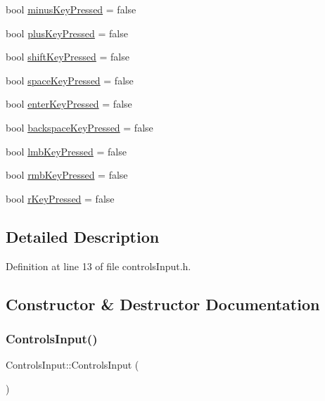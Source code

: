 \begin{DoxyCompactItemize}
\item 
bool \hyperlink{struct_controls_input_a68b463995619f9b9a202dc84301728d0}{minus\+Key\+Pressed} = false
\item 
bool \hyperlink{struct_controls_input_ae4cfd2052a042c57c601ba2c3ed6fec1}{plus\+Key\+Pressed} = false
\item 
bool \hyperlink{struct_controls_input_a94141ee53845274d300476291bf74d7a}{shift\+Key\+Pressed} = false
\item 
bool \hyperlink{struct_controls_input_a36c963eb0406507823f8c69a8c68eba7}{space\+Key\+Pressed} = false
\item 
bool \hyperlink{struct_controls_input_a5026bb8fa2c88f2662eb1dba03599143}{enter\+Key\+Pressed} = false
\item 
bool \hyperlink{struct_controls_input_a5a220f2b624d21ac3ccb2f776a593305}{backspace\+Key\+Pressed} = false
\item 
bool \hyperlink{struct_controls_input_a8b7f874e66eeb9e038c80818feee81a1}{lmb\+Key\+Pressed} = false
\item 
bool \hyperlink{struct_controls_input_ae2486e484981cb64749c2119836687c0}{rmb\+Key\+Pressed} = false
\item 
bool \hyperlink{struct_controls_input_a24e3c06c9b3bbd1b6920bfd605f7390f}{r\+Key\+Pressed} = false
\end{DoxyCompactItemize}


\subsection{Detailed Description}


Definition at line 13 of file controls\+Input.\+h.



\subsection{Constructor \& Destructor Documentation}
\mbox{\label{struct_controls_input_a8df69a74d53e061f3b003a0a6709c1c7}} 
\subsubsection{\texorpdfstring{Controls\+Input()}{ControlsInput()}}
{\footnotesize\ttfamily Controls\+Input\+::\+Controls\+Input (\begin{DoxyParamCaption}{ }\end{DoxyParamCaption})}



